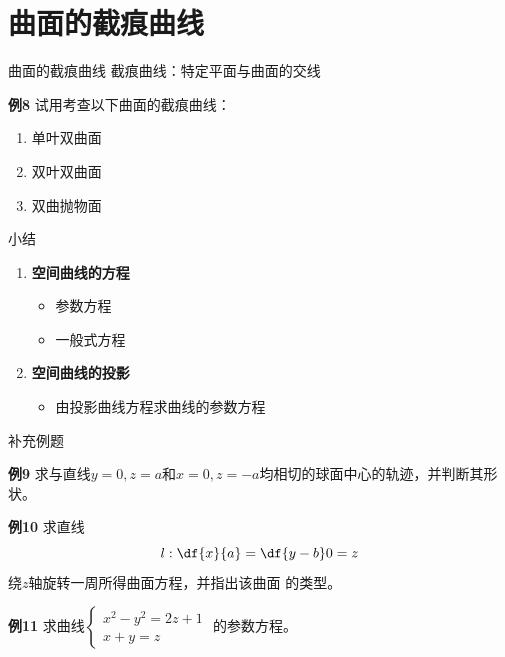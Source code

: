 \section{曲面的截痕曲线}

\begin{frame}{曲面的截痕曲线}
	\linespread{1.2}\pause 
	{\bb 截痕曲线：}特定平面与曲面的交线\pause 
	\begin{exampleblock}{{\bf 例8}\hfill}
		试用考查以下曲面的截痕曲线：
		\begin{enumerate}
		  \item 单叶双曲面
		  \item 双叶双曲面
		  \item 双曲抛物面
		\end{enumerate}
	\end{exampleblock}
\end{frame}

\begin{frame}[<+->]{小结}
	\linespread{1.5}
	\begin{enumerate}
	  \item {\bf 空间曲线的方程}
	  \begin{itemize}
	    \item 参数方程
	    \item 一般式方程
	  \end{itemize}
	  \item {\bf 空间曲线的投影}
	  \begin{itemize}
	    \item 由投影曲线方程求曲线的参数方程
	  \end{itemize}
	\end{enumerate}
\end{frame}

\begin{frame}{补充例题}
	\linespread{1.2}
	\begin{exampleblock}{{\bf 例9}\hfill}
		求与直线$y=0,z=a$和$x=0,z=-a$均相切的球面中心的轨迹，并判断其形状。
	\end{exampleblock}
\end{frame}

\begin{frame}
	\linespread{1.2}
	\begin{exampleblock}{{\bf 例10}\hfill}
		求直线
		$$l:\df{x}{a}=\df{y-b}0=z$$绕$z$轴旋转一周所得曲面方程，并指出该曲面
		的类型。
	\end{exampleblock}
\end{frame}

\begin{frame}
	\linespread{1.2}
	\begin{exampleblock}{{\bf 例11}\hfill}
		求曲线$\left\{\begin{array}{l}
			x^2-y^2=2z+1\\
			x+y=z
		\end{array}\right.$
		的参数方程。
	\end{exampleblock}
\end{frame}

